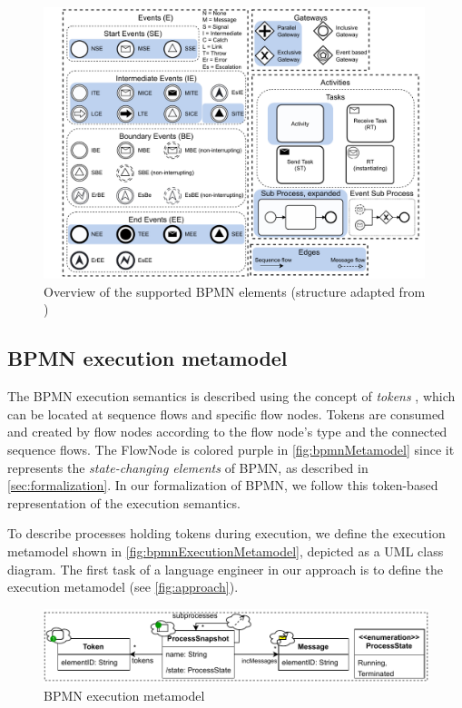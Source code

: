 \documentclass{lmcs} %
\begin{document}
\begin{figure}[ht]
    \centering
    \includegraphics[width=0.99\textwidth]{images/bpmn_semantics-elements-overview.pdf}
    \caption{Overview of the supported BPMN elements (structure adapted from \cite{houhouFirstOrderLogicVerification2022})}
    \label{fig:bpmnelementsOverview}
\end{figure}


\subsection{BPMN execution metamodel}

The BPMN execution semantics is described using the concept of \textit{tokens} \cite{objectmanagementgroupBusinessProcessModel2013, freundRealLifeBPMNUsing2019}, which can be located at sequence flows and specific flow nodes.
Tokens are consumed and created by flow nodes according to the flow node's type and the connected sequence flows.
The \textsf{FlowNode} is colored purple in \autoref{fig:bpmnMetamodel} since it represents the \textit{state-changing elements} of BPMN, as described in \autoref{sec:formalization}.
In our formalization of BPMN, we follow this token-based representation of the execution semantics.

To describe processes holding tokens during execution, we define the execution metamodel shown in \autoref{fig:bpmnExecutionMetamodel}, depicted as a UML class diagram.
The first task of a language engineer in our approach is to define the execution metamodel (see \autoref{fig:approach}).

\begin{figure}[ht]
  \centering
  \includegraphics[width=1\linewidth]{images/bpmn_semantics-typegraph.pdf}
  \caption{BPMN execution metamodel}
  \label{fig:bpmnExecutionMetamodel}
\end{figure}
\end{document}
